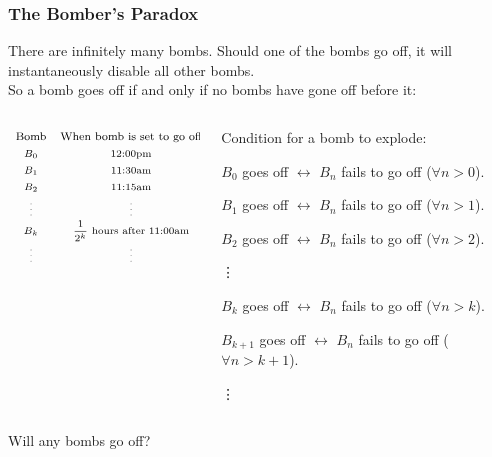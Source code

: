 \begin{frame}
  \frametitle{The Bomber's Paradox}

There are infinitely many bombs. Should one of the bombs go off, it will instantaneously disable all other bombs. \\ So a bomb goes off if and only if no bombs have gone off before it:

  \begin{columns}
    \begin{column}{.4\textwidth}  
 \[
\begin{array}{cc}
\text{\footnotesize Bomb} & \text{\footnotesize When bomb is set to go off} \\
\text{\scriptsize $B_0$} & \text{\scriptsize 12:00pm} \\
\text{\scriptsize $B_1$} & \text{\scriptsize 11:30am} \\
\text{\scriptsize $B_2$} & \text{\scriptsize 11:15am} \\
\text{\tiny\vdots} & \text{\tiny\vdots}\\
\text{\scriptsize $B_k$} & \text{\scriptsize \(\dfrac{1}{2^k}\) hours after 11:00am} \\
\text{\tiny\vdots} & \text{\tiny\vdots}\\
\end{array}
\]  
    \end{column}
    \begin{column}{.6\textwidth}
    \begin{itemize}
    {\scriptsize
\item Condition for a bomb to explode:\\[1.5ex]
\item[(0)] \(B_0\) goes off $\leftrightarrow$ \(B_n\)  fails to go off ($\forall n > 0$). \\[1.5ex]
\item[(1)] \(B_1\) goes off $\leftrightarrow$ \(B_n\)  fails to go off ($\forall n > 1$).  \\[1.5ex]
\item[(2)] \(B_2\) goes off $\leftrightarrow$ \(B_n\) fails to go off ($\forall n > 2$).

\hspace{5mm}\vdots

\item[(k)] \(B_k\) goes off $\leftrightarrow$ \(B_n\) fails to go off ($\forall n > k$).
\item[(k+1)] \(B_{k+1}\) goes off $\leftrightarrow$ \(B_n\) fails to go off ($\forall  n > k+1$).

\hspace{5mm}\vdots }
\end{itemize} 
    \end{column}
  \end{columns}
  Will any bombs go off?
\end{frame}

